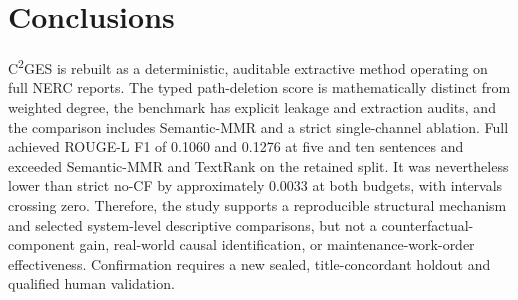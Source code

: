 \documentclass[applsci,article,submit,moreauthors]{Definitions/mdpi}
\newcommand{\cges}{C\textsuperscript{2}GES}
\begin{document}
\section{Conclusions}

\cges{} is rebuilt as a deterministic, auditable extractive method operating on full NERC reports. The typed path-deletion score is mathematically distinct from weighted degree, the benchmark has explicit leakage and extraction audits, and the comparison includes Semantic-MMR and a strict single-channel ablation. Full achieved ROUGE-L F1 of 0.1060 and 0.1276 at five and ten sentences and exceeded Semantic-MMR and TextRank on the retained split. It was nevertheless lower than strict no-CF by approximately 0.0033 at both budgets, with intervals crossing zero. Therefore, the study supports a reproducible structural mechanism and selected system-level descriptive comparisons, but not a counterfactual-component gain, real-world causal identification, or maintenance-work-order effectiveness. Confirmation requires a new sealed, title-concordant holdout and qualified human validation.
\end{document}
